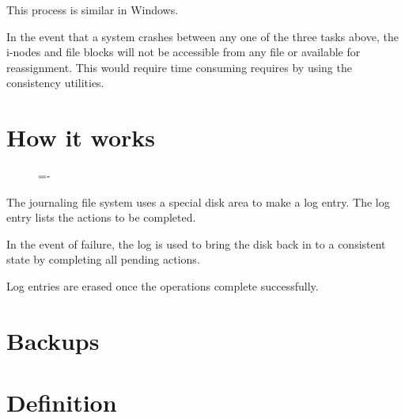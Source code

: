 \documentclass[a4paper]{systems-software}
\begin{document}
This process is similar in Windows.

In the event that a system crashes between any one of the three tasks above, the i-nodes and file blocks will not be accessible from any file or available for reassignment. This would require time consuming requires by using the consistency utilities.


\section*{How it works}

\begin{figure}[H]
  \lineskip=-\fboxrule
\end{figure}

The journaling file system uses a special disk area to make a log entry. The log entry lists the actions to be completed.

In the event of failure, the log is used to bring the disk back in to a consistent state by completing all pending actions.

Log entries are erased once the operations complete successfully.


\newpage

\section{Backups}

\section*{Definition}
\end{document}
